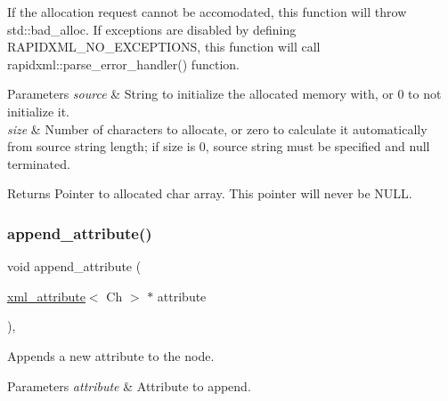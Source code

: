 If the allocation request cannot be accomodated, this function will throw {\ttfamily std\+::bad\+\_\+alloc}. If exceptions are disabled by defining R\+A\+P\+I\+D\+X\+M\+L\+\_\+\+N\+O\+\_\+\+E\+X\+C\+E\+P\+T\+I\+O\+NS, this function will call rapidxml\+::parse\+\_\+error\+\_\+handler() function. 
\begin{DoxyParams}{Parameters}
{\em source} & String to initialize the allocated memory with, or 0 to not initialize it. \\
\hline
{\em size} & Number of characters to allocate, or zero to calculate it automatically from source string length; if size is 0, source string must be specified and null terminated. \\
\hline
\end{DoxyParams}
\begin{DoxyReturn}{Returns}
Pointer to allocated char array. This pointer will never be N\+U\+LL. 
\end{DoxyReturn}
\mbox{\label{classrapidxml_1_1xml__node_a8fbd4f5ef7169d493da9f8d87ac04b77}} 
\subsubsection{\texorpdfstring{append\+\_\+attribute()}{append\_attribute()}}
{\footnotesize\ttfamily void append\+\_\+attribute (\begin{DoxyParamCaption}\item[{\mbox{\hyperlink{classrapidxml_1_1xml__attribute}{xml\+\_\+attribute}}$<$ Ch $>$ $\ast$}]{attribute }\end{DoxyParamCaption})\hspace{0.3cm}{\ttfamily [inline]}, {\ttfamily [inherited]}}



Appends a new attribute to the node. 


\begin{DoxyParams}{Parameters}
{\em attribute} & Attribute to append. \\
\hline
\end{DoxyParams}
\mbox{\label{classrapidxml_1_1xml__node_a86de2e22276826089b7baed2599f8dee}} 
